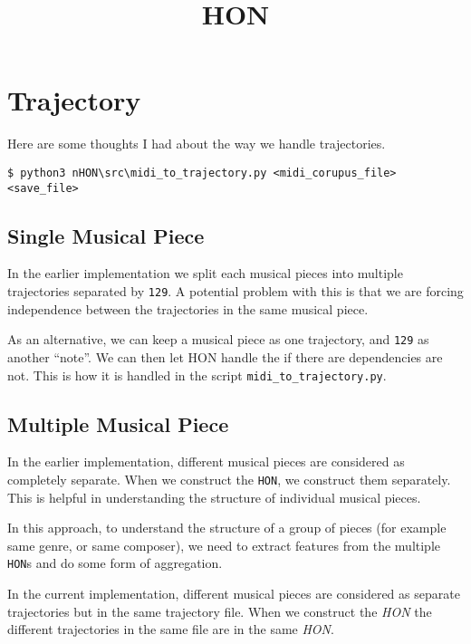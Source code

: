 \documentclass[]{article}
\title{HON}
\author{}
\begin{document}
\maketitle

\begin{abstract}

\end{abstract}

\section{Trajectory}
Here are some thoughts I had about the way we handle trajectories.

\texttt{\$ python3 nHON\textbackslash src\textbackslash midi\_to\_trajectory.py <midi\_corupus\_file> <save\_file>}

\subsection{Single Musical Piece}
In the earlier implementation we split each musical pieces into multiple trajectories separated by \texttt{129}. A potential problem with this is that we are forcing independence between the trajectories in the same musical piece. 

As an alternative, we can keep a musical piece as one trajectory, and \texttt{129} as another ``note''. We can then let HON handle the if there are dependencies are not. This is how it is handled in the script \texttt{midi\_to\_trajectory.py}.

\subsection{Multiple Musical Piece}
In the earlier implementation, different musical pieces are considered as completely separate. When we construct the \texttt{HON}, we construct them separately. This is helpful in understanding the structure of individual musical pieces.

In this approach, to understand the structure of a group of pieces (for example same genre, or same composer), we need to extract features from the multiple \texttt{HON}s and do some form of aggregation.

In the current implementation, different musical pieces are considered as separate trajectories but in the same trajectory file. When we construct the \textit{HON} the different trajectories in the same file are in the same \textit{HON}.
\end{document}
